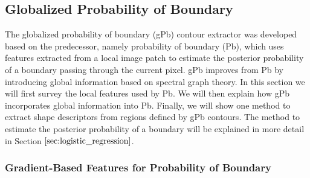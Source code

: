 \documentclass{SMBV13}
\begin{document}
\subsection{Globalized Probability of Boundary}
\label{sec:shape_feature}

The globalized probability of boundary (gPb) contour extractor was developed based on the predecessor, namely probability of boundary (Pb), which uses features extracted from a local image patch to estimate the posterior probability of a boundary passing through the current pixel. gPb improves from Pb by introducing global information based on spectral graph theory. In this section we will first survey the local features used by Pb. We will then explain how gPb incorporates global information into Pb. Finally, we will show one method to extract shape descriptors from regions defined by gPb contours. The method to estimate the posterior probability of a boundary will be explained in more detail in Section $\ref{sec:logistic_regression}$.


\subsubsection{Gradient-Based Features for Probability of Boundary}
\label{sec:textons}
\end{document}
